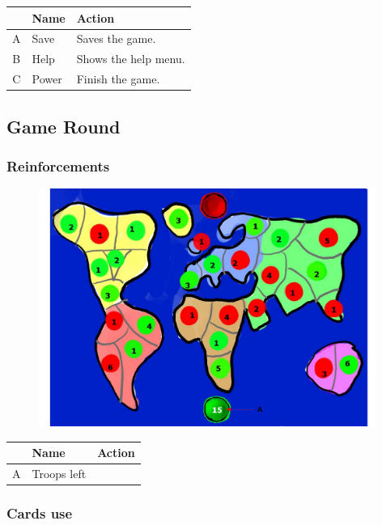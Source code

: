 \documentclass[12pt,a4paper]{article}
\begin{document}
\begin{table}[H]
\small
\centering
\begin{tabular}{c|p{5cm}|p{7cm}}
& Name & Action \\ \hline\hline
A
&Save
&Saves the game.
\\B
&Help
&Shows the help menu.
\\C
&Power
&Finish the game.
\end{tabular}
\end{table}

\subsection{Game Round}

\subsubsection{Reinforcements}

\begin{figure}[H]
  \centering
  \includegraphics[width=11cm]{pic/mocks/5-1.pdf}
\end{figure}

\begin{table}[H]
\small
\centering
\begin{tabular}{c|p{5cm}|p{7cm}}
& Name & Action \\ \hline\hline
A
&Troops left
\end{tabular}
\end{table}

\subsubsection{Cards use}
\end{document}
